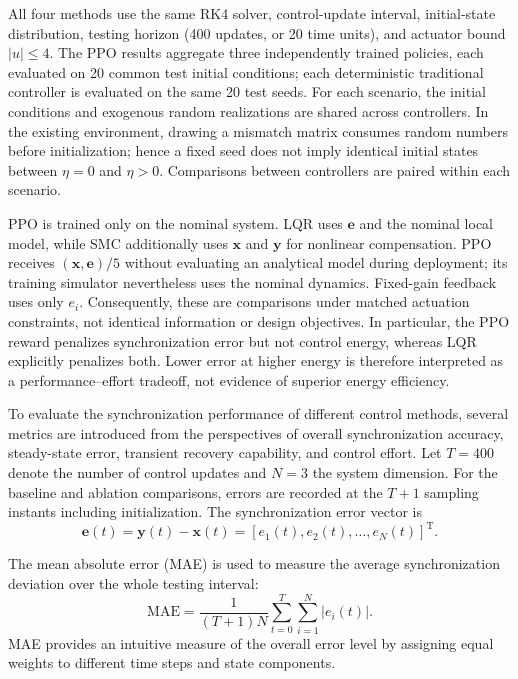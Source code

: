 \documentclass[a4paper,fleqn]{cas-sc}
\theoremstyle{plain}
\theoremstyle{definition}
\begin{document}
All four methods use the same RK4 solver, control-update interval, initial-state distribution, testing horizon (400 updates, or 20 time units), and actuator bound $|u|\leq4$. The PPO results aggregate three independently trained policies, each evaluated on 20 common test initial conditions; each deterministic traditional controller is evaluated on the same 20 test seeds. For each scenario, the initial conditions and exogenous random realizations are shared across controllers. In the existing environment, drawing a mismatch matrix consumes random numbers before initialization; hence a fixed seed does not imply identical initial states between $\eta=0$ and $\eta>0$. Comparisons between controllers are paired within each scenario.

PPO is trained only on the nominal system. LQR uses $\mathbf e$ and the nominal local model, while SMC additionally uses $\mathbf x$ and $\mathbf y$ for nonlinear compensation. PPO receives $(\mathbf x,\mathbf e)/5$ without evaluating an analytical model during deployment; its training simulator nevertheless uses the nominal dynamics. Fixed-gain feedback uses only $e_i$. Consequently, these are comparisons under matched actuation constraints, not identical information or design objectives. In particular, the PPO reward penalizes synchronization error but not control energy, whereas LQR explicitly penalizes both. Lower error at higher energy is therefore interpreted as a performance--effort tradeoff, not evidence of superior energy efficiency.

To evaluate the synchronization performance of different control methods, several metrics are introduced from the perspectives of overall synchronization accuracy, steady-state error, transient recovery capability, and control effort. Let $T=400$ denote the number of control updates and $N=3$ the system dimension. For the baseline and ablation comparisons, errors are recorded at the $T+1$ sampling instants including initialization. The synchronization error vector is
\begin{equation}
	\mathbf{e}(t)=\mathbf{y}(t)-\mathbf{x}(t)
	=
	[e_1(t),e_2(t),\ldots,e_N(t)]^{\mathrm T}.
	\label{eq:error_vector_metrics}
\end{equation}

The mean absolute error (MAE) is used to measure the average synchronization deviation over the whole testing interval:
\begin{equation}
	\mathrm{MAE}
	=
	\frac{1}{(T+1)N}
	\sum_{t=0}^{T}
	\sum_{i=1}^{N}
	|e_i(t)|.
	\label{eq:mae}
\end{equation}
MAE provides an intuitive measure of the overall error level by assigning equal weights to different time steps and state components.
\end{document}
